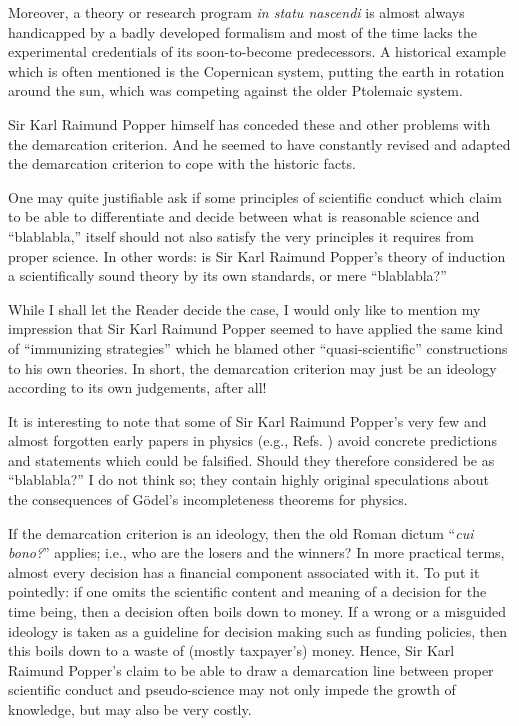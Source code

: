 Moreover, a theory or research program {\it in statu nascendi} is almost always handicapped
by a badly developed formalism and most of the time lacks the experimental credentials
of its soon-to-become predecessors. A historical example which is often mentioned is the Copernican system,
putting the earth in rotation around the sun, which
was competing against the older Ptolemaic system.

Sir Karl Raimund Popper himself has conceded these and other problems with the demarcation criterion.
And he seemed to have constantly revised and adapted the demarcation
criterion to cope with the historic facts.

One may quite justifiable ask if some principles of scientific conduct
which claim to be able to differentiate and decide between what is reasonable science
and ``blablabla,'' itself should not also satisfy the very principles
it requires from proper science. In other words: is Sir Karl Raimund Popper's
theory of induction a scientifically sound theory by its own standards, or mere ``blablabla?''

While I shall let the Reader decide the case, I would only like to mention
my impression that Sir Karl Raimund Popper seemed to have applied the same kind of
``immunizing strategies''
which he blamed other ``quasi-scientific'' constructions
to  his own theories.
In short, the demarcation criterion may just be an ideology according to its own judgements, after all!

It is interesting to note that some of Sir Karl Raimund Popper's very few and
almost forgotten early papers in physics (e.g.,
Refs. \cite{popper-34,popper-50i,popper-50ii})
avoid concrete predictions and statements which could be falsified.
Should they therefore considered be as ``blablabla?''
I do not think so; they contain highly original speculations
about the consequences of G\"odel's incompleteness theorems for physics.


If the demarcation criterion is an ideology,
then the old Roman dictum ``{\it cui bono?}'' applies;
i.e., who are the losers and the winners?
In more practical terms, almost every decision has a financial component
associated with it. To put it pointedly:
if one omits the scientific content and meaning of a decision for the time being,
then a decision often boils down to money.
If a wrong or a misguided ideology is taken as a guideline for decision
making such as funding policies, then this boils down to a waste of
(mostly taxpayer's) money.
Hence,  Sir Karl Raimund Popper's claim to be able to draw a
demarcation line between proper scientific conduct and pseudo-science
may not only impede the growth of knowledge, but may also be
very costly.

